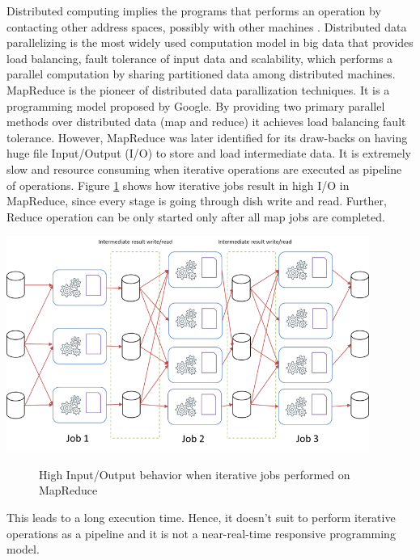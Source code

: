Distributed computing implies the programs that performs an operation by contacting other address spaces, possibly with other machines \cite{DistributedComputing}. Distributed data parallelizing is the most widely used computation model in big data that provides load balancing, fault tolerance of input data  \cite{Jackson2015517} and scalability, which performs a parallel computation by sharing partitioned data among distributed machines. MapReduce is the pioneer of distributed data parallization techniques. It is a programming model proposed by Google. By providing two primary parallel methods over distributed data (map and reduce) it achieves load balancing fault tolerance. However, MapReduce was later identified for its draw-backs on having huge file Input/Output (I/O) to store and load intermediate data. It is extremely slow and resource consuming when iterative operations are executed as pipeline of operations.
Figure \ref{fig:hadoop-high-io} shows how iterative jobs result in high I/O in MapReduce, since every stage is going through dish write and read. Further, Reduce operation can be only started only after all map jobs are completed.
\begin{center}
	\includegraphics[width=32em]{./Figures/hadoop-high-io}
	\begin{figure}[htbp]
    \caption{High Input/Output behavior when iterative jobs performed on MapReduce}
    \label{fig:hadoop-high-io}
	\end{figure}
\end{center}
This leads to a long execution time. 
Hence, it doesn't suit to perform iterative operations as a pipeline and it is not a near-real-time responsive programming model. 
